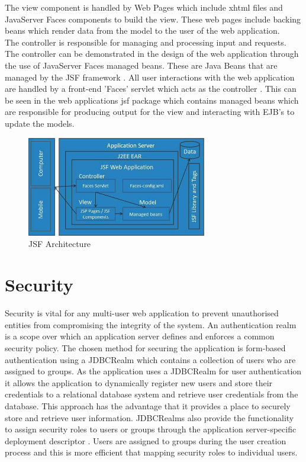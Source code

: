 \documentclass{article}
\begin{document}
The view component is handled by Web Pages which include xhtml files and JavaServer Faces components to build the view. These web pages include backing beans which render data from the model to the user of the web application. \\

The controller is responsible for managing and processing input and requests. The controller can be demonstrated in the design of the web application through the use of JavaServer Faces managed beans. These are Java Beans that are managed by the JSF framework \cite{jsfmanagedbeans}. All user interactions with the web application are handled by a front-end 'Faces' servlet which acts as the controller \cite{whatisjsf}. This can be seen in the web applications jsf package which contains managed beans which are responsible for producing output for the view and interacting with EJB's to update the models.

\begin{figure}[h!]
  \centering
  \includegraphics[width=0.7\textwidth]{images/jsfarchitectute.jpg}
  \caption{JSF Architecture \cite{jsf}}
\end{figure}

\newpage

\section{Security}

Security is vital for any multi-user web application to prevent unauthorised entities from compromising the integrity of the system. An authentication realm is a scope over which an application server defines and enforces a common security policy. The chosen method for securing the application is form-based authentication using a JDBCRealm which contains a collection of users who are assigned to groups. As the application uses a JDBCRealm for user authentication it allows the application to dynamically register new users and store their credentials to a relational database system and retrieve user credentials from the database. This approach has the advantage that it provides a place to securely store and retrieve user information. JDBCRealms also provide the functionality to assign security roles to users or groups through the application server-specific deployment descriptor \cite{JDBC}. Users are assigned to groups during the user creation process and this is more efficient that mapping security roles to individual users. \\
\end{document}
